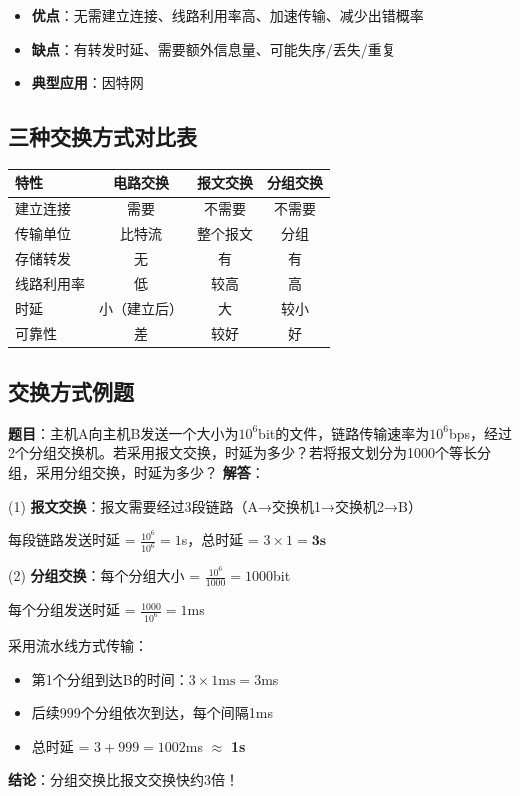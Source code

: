\begin{itemize}[leftmargin=2em,itemsep=0pt]
    \item \textbf{优点}：无需建立连接、线路利用率高、加速传输、减少出错概率
    \item \textbf{缺点}：有转发时延、需要额外信息量、可能失序/丢失/重复
    \item \textbf{典型应用}：因特网
\end{itemize}

\subsection{三种交换方式对比表}
\begin{table}[htbp]
\centering\small
\begin{tabular}{lccc}
\toprule
\textbf{特性} & \textbf{电路交换} & \textbf{报文交换} & \textbf{分组交换} \\
\midrule
建立连接 & 需要 & 不需要 & 不需要 \\
传输单位 & 比特流 & 整个报文 & 分组 \\
存储转发 & 无 & 有 & 有 \\
线路利用率 & 低 & 较高 & 高 \\
时延 & 小（建立后） & 大 & 较小 \\
可靠性 & 差 & 较好 & 好 \\
\bottomrule
\end{tabular}
\end{table}

\subsection{交换方式例题}
\begin{examplebox}[例题1.1 分组交换时延计算]
\textbf{题目}：主机A向主机B发送一个大小为$10^6$bit的文件，链路传输速率为$10^6$bps，经过2个分组交换机。若采用报文交换，时延为多少？若将报文划分为1000个等长分组，采用分组交换，时延为多少？
\tcblower
\textbf{解答}：

(1) \textbf{报文交换}：报文需要经过3段链路（A→交换机1→交换机2→B）

每段链路发送时延 = $\frac{10^6}{10^6} = 1$s，总时延 = $3 \times 1 = \textbf{3s}$

(2) \textbf{分组交换}：每个分组大小 = $\frac{10^6}{1000} = 1000$bit

每个分组发送时延 = $\frac{1000}{10^6} = 1$ms

采用流水线方式传输：
\begin{itemize}[itemsep=0pt]
    \item 第1个分组到达B的时间：$3 \times 1\text{ms} = 3$ms
    \item 后续999个分组依次到达，每个间隔1ms
    \item 总时延 = $3 + 999 = 1002$ms $\approx$ \textbf{1s}
\end{itemize}

\textbf{结论}：分组交换比报文交换快约3倍！
\end{examplebox}

